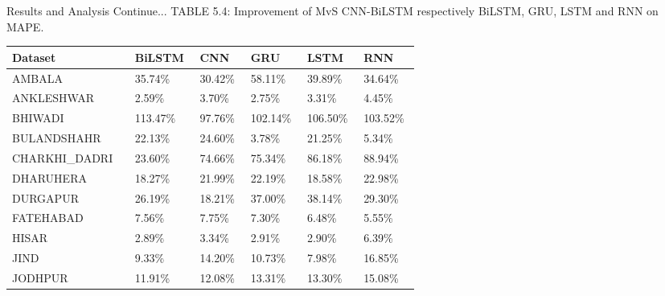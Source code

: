 \documentclass[12pt, aspectratio=169]{beamer}
\begin{document}
\begin{frame}{Results and Analysis \tiny{Continue...}}
	\centering
	\scriptsize{TABLE 5.4: Improvement of MvS CNN-BiLSTM respectively BiLSTM,  GRU,  LSTM and RNN on MAPE.}
	\begin{table}
        \begin{tabular}{ |p{0.19\linewidth} |p{0.08\linewidth} |p{0.08\linewidth} |p{0.08\linewidth} | p{0.08\linewidth} |p{0.08\linewidth}|}%
		\hline \scriptsize Dataset        & \scriptsize   BiLSTM & \scriptsize   CNN & \scriptsize  GRU & \scriptsize   LSTM & \scriptsize   RNN \\ \hline
		\scriptsize AMBALA & \scriptsize 35.74\% & \scriptsize 30.42\% & \scriptsize 58.11\% & \scriptsize 39.89\% & \scriptsize 34.64\% \\ \hline
		\scriptsize ANKLESHWAR & \scriptsize 2.59\% & \scriptsize 3.70\% & \scriptsize 2.75\% & \scriptsize 3.31\% & \scriptsize 4.45\% \\ \hline
		\scriptsize BHIWADI & \scriptsize 113.47\% & \scriptsize 97.76\% & \scriptsize 102.14\% & \scriptsize 106.50\% & \scriptsize 103.52\% \\ \hline
		\scriptsize BULANDSHAHR & \scriptsize 22.13\% & \scriptsize 24.60\% & \scriptsize 3.78\% & \scriptsize 21.25\% & \scriptsize 5.34\% \\ \hline
		\scriptsize CHARKHI\_DADRI & \scriptsize 23.60\% & \scriptsize 74.66\% & \scriptsize 75.34\% & \scriptsize 86.18\% & \scriptsize 88.94\% \\ \hline
		\scriptsize DHARUHERA & \scriptsize 18.27\% & \scriptsize 21.99\% & \scriptsize 22.19\% & \scriptsize 18.58\% & \scriptsize 22.98\% \\ \hline
		\scriptsize DURGAPUR & \scriptsize 26.19\% & \scriptsize 18.21\% & \scriptsize 37.00\% & \scriptsize 38.14\% & \scriptsize 29.30\% \\ \hline
		\scriptsize FATEHABAD & \scriptsize 7.56\% & \scriptsize 7.75\% & \scriptsize 7.30\% & \scriptsize 6.48\% & \scriptsize 5.55\% \\ \hline
		\scriptsize HISAR & \scriptsize 2.89\% & \scriptsize 3.34\% & \scriptsize 2.91\% & \scriptsize 2.90\% & \scriptsize 6.39\% \\ \hline
		\scriptsize JIND & \scriptsize 9.33\% & \scriptsize 14.20\% & \scriptsize 10.73\% & \scriptsize 7.98\% & \scriptsize 16.85\% \\ \hline
		\scriptsize JODHPUR & \scriptsize 11.91\% & \scriptsize 12.08\% & \scriptsize 13.31\% & \scriptsize 13.30\% & \scriptsize 15.08\% \\ \hline

\end{tabular}
\end{table}
\end{frame}
\end{document}
